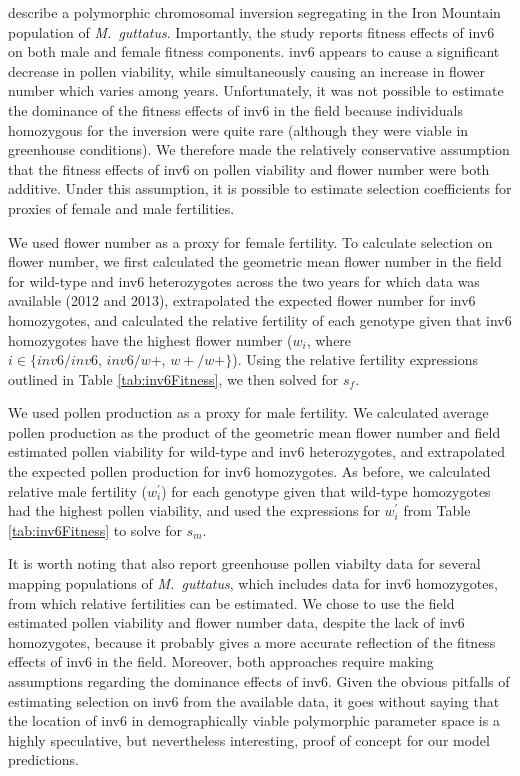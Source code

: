 \documentclass[11pt,draft]{article}
\begin{document}
\citet{LeeKelly2015} describe a polymorphic chromosomal inversion segregating in the Iron Mountain population of {\itshape M.~guttatus}. Importantly, the study reports fitness effects of inv6 on both male and female fitness components. inv6 appears to cause a significant decrease in pollen viability, while simultaneously causing an increase in flower number which varies among years. Unfortunately, it was not possible to estimate the dominance of the fitness effects of inv6 in the field because individuals homozygous for the inversion were quite rare (although they were viable in greenhouse conditions). We therefore made the relatively conservative assumption that the fitness effects of inv6 on pollen viability and flower number were both additive. Under this assumption, it is possible to estimate selection coefficients for proxies of female and male fertilities. 

We used flower number as a proxy for female fertility. To calculate selection on flower number, we first calculated the geometric mean flower number in the field for wild-type and inv6 heterozygotes across the two years for which data was available (2012 and 2013), extrapolated the expected flower number for inv6 homozygotes, and calculated the relative fertility of each genotype given that inv6 homozygotes have the highest flower number ($w_i$, where $i \in \{inv6/inv6,\, inv6/w+,\, w+/w+\}$). Using the relative fertility expressions outlined in Table \ref{tab:inv6Fitness}, we then solved for $s_f$. 

We used pollen production as a proxy for male fertility. We calculated average pollen production as the product of the geometric mean flower number and field estimated pollen viability for wild-type and inv6 heterozygotes, and extrapolated the expected pollen production for inv6 homozygotes. As before, we calculated relative male fertility ($w^{\prime}_i$) for each genotype given that wild-type homozygotes had the highest pollen viability, and used the expressions for $w^{\prime}_{i}$ from Table \ref{tab:inv6Fitness} to solve for $s_m$.

It is worth noting that \citet{LeeKelly2015} also report greenhouse pollen viabilty data for several mapping populations of {\itshape M.~guttatus}, which includes data for inv6 homozygotes, from which relative fertilities can be estimated. We chose to use the field estimated pollen viability and flower number data, despite the lack of inv6 homozygotes, because it probably gives a more accurate reflection of the fitness effects of inv6 in the field. Moreover, both approaches require making assumptions regarding the dominance effects of inv6. Given the obvious pitfalls of estimating selection on inv6 from the available data, it goes without saying that the location of inv6 in demographically viable polymorphic parameter space is a highly speculative, but nevertheless interesting, proof of concept for our model predictions.
\end{document}

